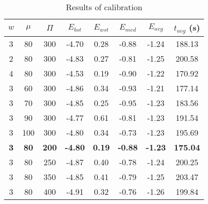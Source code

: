 \begin{table}[H]
\centering
\begin{tabular}{@{}cccccccc@{}}
\toprule
$w$ & $\mu$ & $\Pi$ & $E_{bst}$ & $E_{wst}$ & $E_{med}$ & $E_{avg}$ & $t_{avg}$ (s) \\ \midrule
3 & 80 & 300 & -4.70 & 0.28 & -0.88 & -1.24 & 188.13 \\
2 & 80 & 300 & -4.83 & 0.27 & -0.81 & -1.25 & 200.58 \\
4 & 80 & 300 & -4.53 & 0.19 & -0.90 & -1.22 & 170.92 \\
3 & 60 & 300 & -4.86 & 0.34 & -0.93 & -1.21 & 177.14 \\
3 & 70 & 300 & -4.85 & 0.25 & -0.95 & -1.23 & 183.56 \\
3 & 90 & 300 & -4.77 & 0.61 & -0.81 & -1.23 & 191.54 \\
3 & 100 & 300 & -4.80 & 0.34 & -0.73 & -1.23 & 195.69 \\
\textbf{3} & \textbf{80} & \textbf{200} & \textbf{-4.80} & \textbf{0.19} & \textbf{-0.88} & \textbf{-1.23} & \textbf{175.04} \\
3 & 80 & 250 & -4.87 & 0.40 & -0.78 & -1.24 & 200.25 \\
3 & 80 & 350 & -4.85 & 0.41 & -0.79 & -1.25 & 203.47 \\
3 & 80 & 400 & -4.91 & 0.32 & -0.76 & -1.26 & 199.84 \\ \bottomrule
\end{tabular}
\caption{Results of calibration}
\label{calibration-results}
\end{table}